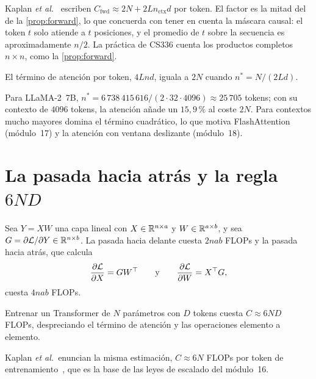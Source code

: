 \begin{observacion}
Kaplan \emph{et al.}~\cite[§2.1, ecuación~(2.2)]{kaplan} escriben $C_{\mathrm{fwd}}\approx 2N+2Ln_{\mathrm{ctx}}d$ por token. El factor es la mitad del de la \cref{prop:forward}, lo que concuerda con tener en cuenta la máscara causal: el token $t$ solo atiende a $t$ posiciones, y el promedio de $t$ sobre la secuencia es aproximadamente $n/2$. La práctica de CS336 cuenta los productos completos $n\times n$, como la \cref{prop:forward}.
\end{observacion}

\begin{corolario}\label{cor:nstar}
El término de atención por token, $4Lnd$, iguala a $2N$ cuando $n^{*}=N/(2Ld)$.
\end{corolario}

Para LLaMA-2~7B, $n^{*}=6\,738\,415\,616/(2\cdot 32\cdot 4096)\approx 25\,705$ tokens; con su contexto de $4096$ tokens, la atención añade un $15{,}9\,\%$ al coste $2N$. Para contextos mucho mayores domina el término cuadrático, lo que motiva FlashAttention (módulo~17) y la atención con ventana deslizante (módulo~18).

\section{La pasada hacia atrás y la regla \texorpdfstring{$6ND$}{6ND}}

\begin{teorema}\label{teo:backward}
Sea $Y=XW$ una capa lineal con $X\in\mathbb{R}^{n\times a}$ y $W\in\mathbb{R}^{a\times b}$, y sea $G=\partial\mathcal{L}/\partial Y\in\mathbb{R}^{n\times b}$. La pasada hacia delante cuesta $2nab$ FLOPs y la pasada hacia atrás, que calcula
\[
\frac{\partial\mathcal{L}}{\partial X}=GW^{\top}\qquad\text{y}\qquad\frac{\partial\mathcal{L}}{\partial W}=X^{\top} G,
\]
cuesta $4nab$ FLOPs.
\end{teorema}

\begin{corolario}[Regla $6ND$]\label{cor:6nd}
Entrenar un Transformer de $N$ parámetros con $D$ tokens cuesta $C\approx 6ND$ FLOPs, despreciando el término de atención y las operaciones elemento a elemento.
\end{corolario}

Kaplan \emph{et al.}\ enuncian la misma estimación, $C\approx 6N$ FLOPs por token de entrenamiento~\cite[§2.1]{kaplan}, que es la base de las leyes de escalado del módulo~16.

\addtocounter{definicion}{1}%

\addtocounter{definicion}{1}%

